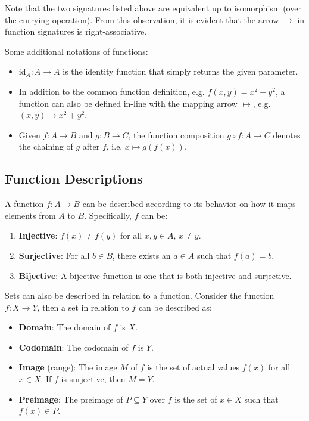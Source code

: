 \documentclass[12pt]{article}
\theoremstyle{definition}
\newcommand{\id}[1]{\text{id}_{#1}}
\begin{document}
 	Note that the two signatures listed above are equivalent up to isomorphism (over the currying operation). From this observation, it is evident that the arrow $\to$ in function signatures is right-associative.
 	
 	Some additional notations of functions:
 	\begin{itemize}
 		\item $\id{A}: A \to A$ is the identity function that simply returns the given parameter.
 		\item In addition to the common function definition, e.g. $f(x, y) = x^2 + y^2$, a function can also be defined in-line with the mapping arrow $\mapsto$, e.g. $(x, y) \mapsto x^2 + y^2$.
 		\item Given $f : A \to B$ and $g : B \to C$, the function composition $g \circ f : A \to C$ denotes the chaining of $g$ after $f$, i.e. $x \mapsto g(f(x))$.
 	\end{itemize}
 	
 	\subsection{Function Descriptions}
 	
 	A function $f : A \to B$ can be described according to its behavior on how it maps elements from $A$ to $B$. Specifically, $f$ can be:
 	\begin{enumerate}
 		\item \textbf{Injective}: $f(x) \neq f(y)$ for all $x, y \in A$, $x \neq y$.
 		\item \textbf{Surjective}: For all $b \in B$, there exists an $a \in A$ such that $f(a) = b$.
 		\item \textbf{Bijective}: A bijective function is one that is both injective and surjective.
 	\end{enumerate}
 	
 	Sets can also be described in relation to a function. Consider the function $f : X \to Y$, then a set in relation to $f$ can be described as:
 	\begin{itemize}
 		\item \textbf{Domain}: The domain of $f$ is $X$.
 		\item \textbf{Codomain}: The codomain of $f$ is $Y$.
 		\item \textbf{Image} (range): The image $M$ of $f$ is the set of actual values $f(x)$ for all $x \in X$. If $f$ is surjective, then $M = Y$.
 		\item \textbf{Preimage}: The preimage of $P \subseteq Y$ over $f$ is the set of $x \in X$ such that $f(x) \in P$.
 	\end{itemize}
 	
\end{document}
